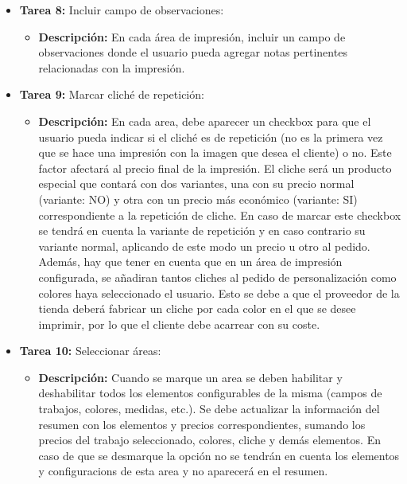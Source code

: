 \documentclass[11pt]{article}
\begin{document}
\begin{itemize}
\begin{itemize}[label=--]
          \end{itemize}
    \item \textbf{Tarea 8:} Incluir campo de observaciones:
          \begin{itemize}[label=--]
              \item \textbf{Descripción:} En cada área de impresión, incluir un campo de observaciones donde el usuario pueda agregar notas pertinentes relacionadas con la impresión.
          \end{itemize}
    
    \item \textbf{Tarea 9:} Marcar cliché de repetición:
          \begin{itemize}[label=--]
              \item \textbf{Descripción:} En cada area, debe aparecer un checkbox para que el usuario pueda indicar si el cliché es de repetición (no es la primera vez que se hace una impresión con la imagen que desea el cliente) o no. Este factor afectará al precio final de la impresión. El cliche será un producto especial que contará con dos variantes, una con su precio normal (variante: NO) y otra con un precio más económico (variante: SI) correspondiente a la repetición de cliche. En caso de marcar este checkbox se tendrá en cuenta la variante de repetición y en caso contrario su variante normal, aplicando de este modo un precio u otro al pedido. Además, hay que tener en cuenta que en un área de impresión configurada, se añadiran tantos cliches al pedido de personalización como colores haya seleccionado el usuario. Esto se debe a que el proveedor de la tienda deberá fabricar un cliche por cada color en el que se desee imprimir, por lo que el cliente debe acarrear con su coste.
          \end{itemize}
    \item \textbf{Tarea 10:} Seleccionar áreas:
          \begin{itemize}[label=--]
              \item \textbf{Descripción:} Cuando se marque un area se deben habilitar y deshabilitar todos los elementos configurables de la misma (campos de trabajos, colores, medidas, etc.). Se debe actualizar la información del resumen con los elementos y precios correspondientes, sumando los precios del trabajo seleccionado, colores, cliche y demás elementos. En caso de que se desmarque la opción no se tendrán en cuenta los elementos y configuracions de esta area y no aparecerá en el resumen.
          \end{itemize}

\end{itemize}
\end{document}
